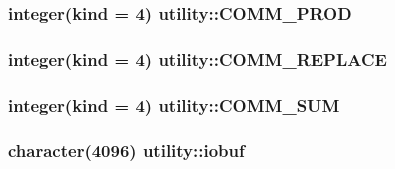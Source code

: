 \hypertarget{namespaceutility_ac007ebc5ff080707309b709eaf627c4f}{
\subsubsection[{COMM\_\-PROD}]{\setlength{\rightskip}{0pt plus 5cm}integer(kind = 4) {\bf utility::COMM\_\-PROD}}}
\label{namespaceutility_ac007ebc5ff080707309b709eaf627c4f}
\hypertarget{namespaceutility_a0774c1eca038528c11297ffd22bbbfaa}{
\subsubsection[{COMM\_\-REPLACE}]{\setlength{\rightskip}{0pt plus 5cm}integer(kind = 4) {\bf utility::COMM\_\-REPLACE}}}
\label{namespaceutility_a0774c1eca038528c11297ffd22bbbfaa}
\hypertarget{namespaceutility_ab4f4798be78a04776caf765b9649fb40}{
\subsubsection[{COMM\_\-SUM}]{\setlength{\rightskip}{0pt plus 5cm}integer(kind = 4) {\bf utility::COMM\_\-SUM}}}
\label{namespaceutility_ab4f4798be78a04776caf765b9649fb40}
\hypertarget{namespaceutility_a3003cfe86f93564a5c4458faa6c5124f}{
\subsubsection[{iobuf}]{\setlength{\rightskip}{0pt plus 5cm}character(4096) {\bf utility::iobuf}}}
\label{namespaceutility_a3003cfe86f93564a5c4458faa6c5124f}
